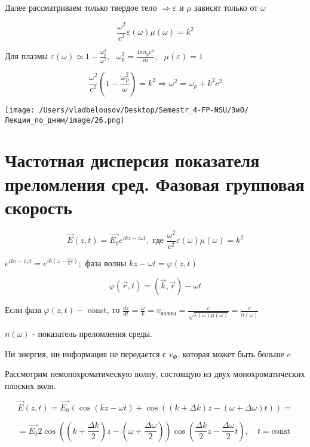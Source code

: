 \documentclass[12pt, a4paper]{report}
\begin{document}
Далее рассматриваем только твердое тело \( \Rightarrow  \varepsilon  \) и \( \mu     \)  зависят только от \( \omega \) 

\[ \frac{\omega ^2 }{c ^2 } \varepsilon( \omega ) \mu ( \omega) = k ^2   \] 

Для плазмы  \( \displaystyle \varepsilon ( \omega ) \simeq 1- \frac{\omega _p ^2 }{\omega ^2 } , \text{ } \omega _ p ^2 = \frac{4 \pi n_p e ^2 }{m } , \text{ } \mu ( \varepsilon ) = 1    \) 

\[ \frac{\omega ^2 }{c ^2 } \left(  1 - \frac{\omega _p ^2}{\omega}  \right) =k ^2 \Rightarrow \omega ^2 = \omega_p + k ^2 c ^2   \] 

\begin{center}
    \texttt{[image: /Users/vladbelousov/Desktop/Semestr\_4-FP-NSU/ЭиО/Лекции\_по\_дням/image/26.png]}
\end{center}

\section{Частотная дисперсия показателя преломления сред. Фазовая групповая скорость}

\[ \vec{E } (z,t ) = \vec{E_0 }e^{ikz - i \omega t }  , \text{ где } \frac{\omega ^2 }{c ^2 }\varepsilon ( \omega )\mu( \omega ) =k ^2    \] 

\( e^{ikz - i \omega t }=e^{ik(z- \frac{\omega}{k } t  )} ;   \) фаза волны \( kz - \omega t = \varphi( z, t ) \) 

\[ \varphi ( \vec{r } , t ) = ( \vec{k }  , \vec{r }  ) - \omega t  \] 

Если фаза \(\displaystyle  \varphi( z , t ) -  \) const, то  \( \displaystyle \frac{dz}{dt } = \frac{\omega}{k } = v_{\text{волны} } = \frac{c}{\sqrt{\varepsilon (\omega ) \mu ( \omega)}} =\frac{c}{ n ( \omega)}   \)

\( n ( \omega ) \) - показатель преломления среды. 

Ни энергия, ни информация не передается с \( v_{\Phi  }  \), которая может быть больше \( c \) 

Рассмотрим немонохроматическую волну, состоящую из двух монохроматических плоских волн. 

\[ \vec{E }  (z, t ) = \vec{E_0 }(\cos (kz - \omega t )+ \cos  ( (k+ \Delta k)z - ( \omega +\Delta \omega )t))=\]

\[ = \vec{E_0 } 2 \cos \left( \left( k+ \frac{\Delta k}{2}  \right)z - \left( \omega + \frac{\Delta \omega}{2}  \right) \right) \cos \left(  \frac{\Delta k }{2} z - \frac{\Delta \omega }{2 }  t   \right), \quad t=\text{const }     \] 
\end{document}
